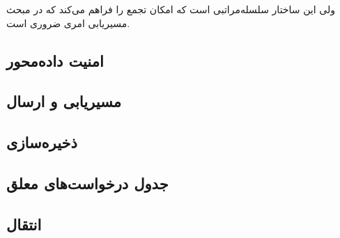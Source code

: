  ولی این ساختار سلسله‌مراتبی است که امکان تجمع را فراهم می‌کند که در مبحث مسیریابی امری ضروری است. 


\subsection{امنیت داده‌محور}
\subsection{مسیریابی و ارسال}
\subsection{ذخیره‌سازی}
\subsection{جدول درخواست‌های معلق}
\subsection{انتقال}